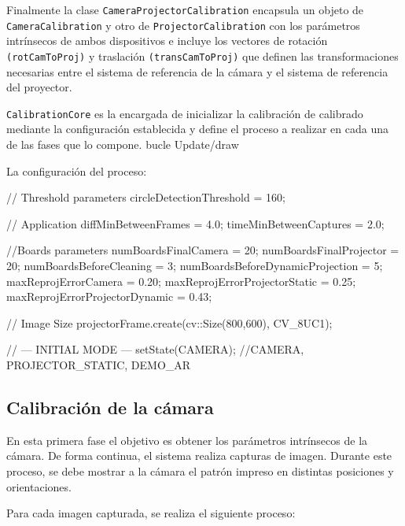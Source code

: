 Finalmente la clase \texttt{CameraProjectorCalibration} encapsula un objeto de  \texttt{CameraCalibration} y otro de \texttt{ProjectorCalibration} con los parámetros intrínsecos de ambos dispositivos e incluye los vectores de rotación \texttt{(rotCamToProj)} y traslación \texttt{(transCamToProj)} que definen las transformaciones necesarias entre el sistema de referencia de la cámara y el sistema de referencia del proyector. 

\texttt{CalibrationCore} es la encargada de inicializar la calibración de calibrado mediante la configuración establecida y define el proceso a realizar en cada una de las fases que lo compone.  bucle Update/draw

La configuración del proceso:
\begin{listing}[
  float=ht,
  language = C++,
  caption  = {Configuración de la clase CalibrationCore},
  label    = code:CalibCore]
  // Threshold parameters
  circleDetectionThreshold = 160;
  
  // Application
  diffMinBetweenFrames = 4.0; 
  timeMinBetweenCaptures = 2.0; 
  
  //Boards parameters
  numBoardsFinalCamera = 20;  
  numBoardsFinalProjector = 20;
  numBoardsBeforeCleaning = 3;  
  numBoardsBeforeDynamicProjection = 5; 
  maxReprojErrorCamera = 0.20;
  maxReprojErrorProjectorStatic = 0.25;
  maxReprojErrorProjectorDynamic = 0.43;

  // Image Size
  projectorFrame.create(cv::Size(800,600), CV_8UC1);
  
  // --- INITIAL MODE ---
  setState(CAMERA); //CAMERA, PROJECTOR_STATIC, DEMO_AR
\end{listing}
  
\subsection{Calibración de la cámara}
En esta primera fase el objetivo es obtener los parámetros intrínsecos de la cámara. De forma continua, el sistema realiza capturas de imagen. Durante este proceso, se debe mostrar a la cámara el patrón impreso en distintas posiciones y orientaciones. 

Para cada imagen capturada, se realiza el siguiente proceso:

